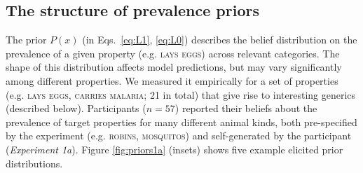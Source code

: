 \documentclass{pnastwo}
\begin{document}
\begin{article}
\subsection{The structure of prevalence priors}




 The prior $P(x)$ (in Eqs.~\ref{eq:L1}, \ref{eq:L0}) describes the belief distribution on the prevalence of a given property (e.g. \textsc{lays eggs}) across relevant categories. 
The shape of this distribution affects model predictions, but may vary significantly among different properties.
 We measured it empirically for a set of properties (e.g. \textsc{lays eggs, carries malaria}; 21 in total) that give rise to interesting generics (described below). 
 Participants ($n=57$) reported their beliefs about the prevalence of target properties for many different animal kinds, both pre-specified by the experiment (e.g. \textsc{robins, mosquitos}) and self-generated by the participant (\emph{Experiment 1a}).
 Figure \ref{fig:priors1a} (insets) shows five example elicited prior distributions.


\end{article}
\end{document}
